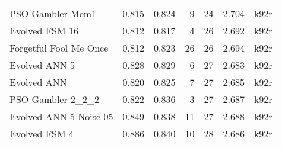 \begin{tabular}{lrrrrrl}
PSO Gambler Mem1           &                               0.815 &                            0.824 &             9 &    24 &  2.704 &   k92r \\
Evolved FSM 16             &                               0.812 &                            0.817 &             4 &    26 &  2.692 &   k92r \\
Forgetful Fool Me Once     &                               0.812 &                            0.823 &            26 &    26 &  2.694 &   k92r \\
Evolved ANN 5              &                               0.828 &                            0.829 &             6 &    27 &  2.683 &   k92r \\
Evolved ANN                &                               0.820 &                            0.825 &             7 &    27 &  2.685 &   k92r \\
PSO Gambler 2\_2\_2          &                               0.822 &                            0.836 &             3 &    27 &  2.687 &   k92r \\
Evolved ANN 5 Noise 05     &                               0.849 &                            0.838 &            11 &    27 &  2.688 &   k92r \\
Evolved FSM 4              &                               0.886 &                            0.840 &            10 &    28 &  2.686 &   k92r \\
\bottomrule
\end{tabular}
